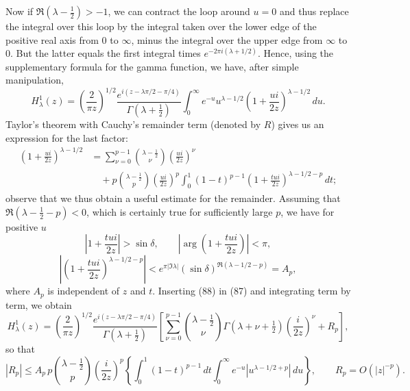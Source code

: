 Now if $\Re(\lambda-\tfrac12)>-1$, we can contract the loop around $u=0$ and thus replace the integral over this loop by the integral taken over the lower edge of the positive real axis from 0 to $\infty$, minus the integral over the upper edge from $\infty$ to 0. But the latter equals the first integral times $e^{-2\pi i(\lambda+1/2)}$. Hence, using the supplementary formula for the gamma function, we have, after simple manipulation,
\begin{equation}\tag{87}
H_\lambda^1(z)=\left(\frac{2}{\pi z}\right)^{1/2}
\frac{e^{i(z-\lambda\pi/2-\pi/4)}}{\Gamma(\lambda+\tfrac12)}
\int_0^\infty e^{-u}u^{\lambda-1/2}
\left(1+\frac{ui}{2z}\right)^{\lambda-1/2}\,du.
\end{equation}
Taylor's theorem with Cauchy's remainder term (denoted by $R$) gives us an expression for the last factor:
\begin{equation}\tag{88}
\begin{aligned}
\left(1+\frac{ui}{2z}\right)^{\lambda-1/2}
&=\sum_{\nu=0}^{p-1}{\lambda-\tfrac12\choose\nu}
\left(\frac{ui}{2z}\right)^\nu\\
&\quad+p{\lambda-\tfrac12\choose p}\left(\frac{ui}{2z}\right)^p
\int_0^1(1-t)^{p-1}
\left(1+\frac{tui}{2z}\right)^{\lambda-1/2-p}\,dt;
\end{aligned}
\end{equation}
observe that we thus obtain a useful estimate for the remainder. Assuming that $\Re(\lambda-\tfrac12-p)<0$, which is certainly true for sufficiently large $p$, we have for positive $u$
\[
\left|1+\frac{tui}{2z}\right|>\sin\delta,
\qquad
\left|\arg\left(1+\frac{tui}{2z}\right)\right|<\pi,
\]
\[
\left|\left(1+\frac{tui}{2z}\right)^{\lambda-1/2-p}\right|
<e^{\pi|\Im\lambda|}(\sin\delta)^{\Re(\lambda-1/2-p)}=A_p,
\]
where $A_p$ is independent of $z$ and $t$. Inserting (88) in (87) and integrating term by term, we obtain
\begin{equation}\tag{89}
H_\lambda^1(z)=\left(\frac{2}{\pi z}\right)^{1/2}
\frac{e^{i(z-\lambda\pi/2-\pi/4)}}{\Gamma(\lambda+\tfrac12)}
\left[\sum_{\nu=0}^{p-1}{\lambda-\tfrac12\choose\nu}
\Gamma(\lambda+\nu+\tfrac12)\left(\frac{i}{2z}\right)^\nu+R_p\right],
\end{equation}
so that
\[
|R_p|\le A_p\,p{\lambda-\tfrac12\choose p}\left(\frac{i}{2z}\right)^p
\left\{\int_0^1(1-t)^{p-1}\,dt\int_0^\infty e^{-u}|u^{\lambda-1/2+p}|\,du\right\},
\qquad R_p=O(|z|^{-p}).
\]

